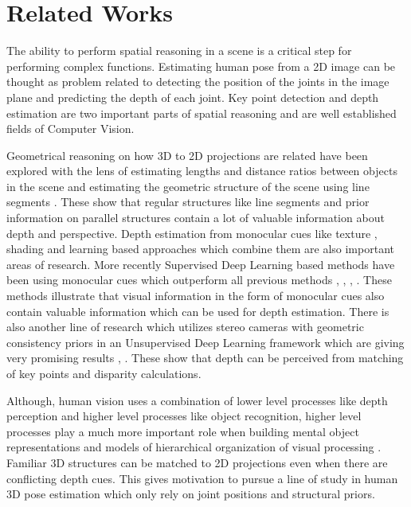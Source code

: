 
\chapter{Related Works}\label{chapter:relatedworks}

The ability to perform spatial reasoning in a scene is a critical step for performing complex functions. Estimating human pose from a 2D image can be thought as problem related to detecting the position of the joints in the image plane and predicting the depth of each joint. Key point detection and depth estimation are two important parts of spatial reasoning and are well established fields of Computer Vision. 

Geometrical reasoning on how 3D to 2D projections are related have been explored with the lens of estimating lengths and distance ratios between objects in the scene \parencite{criminisi2000single} and estimating the geometric structure of the scene using line segments \parencite{lee2009geometric}. These show that regular structures like line segments and prior information on parallel structures contain a lot of valuable information about depth and perspective. Depth estimation from monocular cues like texture \parencite{lindeberg1993shape}, shading \parencite{zhang1999shape} and learning based approaches which combine them \parencite{saxena2006learning} are also important areas of research. More recently Supervised Deep Learning based methods have been using monocular cues which outperform all previous methods \parencite{eigen2014depth}, \parencite{eigen2015predicting}, \parencite{liu2015deep}, \parencite{liu2016learning}. These methods illustrate that visual information in the form of monocular cues also contain valuable information which can be used for depth estimation. There is also another line of research which utilizes stereo cameras with geometric consistency priors in an Unsupervised Deep Learning framework which are giving very promising results \parencite{garg2016unsupervised}, \parencite{godard2017unsupervised}. These show that depth can be perceived from matching of key points and disparity calculations. 

Although, human vision uses a combination of lower level processes like depth perception and higher level processes like object recognition, higher level processes play a much more important role when building mental object representations and models of hierarchical organization of visual processing \parencite{bulthoff1998top}. Familiar 3D structures can be matched to 2D projections even when there are conflicting depth cues. This gives motivation to pursue a line of study in human 3D pose estimation which only rely on joint positions and structural priors. 

